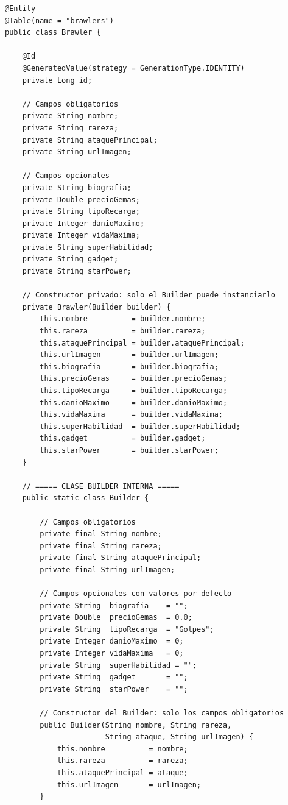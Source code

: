 \documentclass[12pt,a4paper]{article}
\begin{document}
\begin{lstlisting}[caption={Brawler.java -- La entidad con Builder interno}]
@Entity
@Table(name = "brawlers")
public class Brawler {

    @Id
    @GeneratedValue(strategy = GenerationType.IDENTITY)
    private Long id;

    // Campos obligatorios
    private String nombre;
    private String rareza;
    private String ataquePrincipal;
    private String urlImagen;

    // Campos opcionales
    private String biografia;
    private Double precioGemas;
    private String tipoRecarga;
    private Integer danioMaximo;
    private Integer vidaMaxima;
    private String superHabilidad;
    private String gadget;
    private String starPower;

    // Constructor privado: solo el Builder puede instanciarlo
    private Brawler(Builder builder) {
        this.nombre          = builder.nombre;
        this.rareza          = builder.rareza;
        this.ataquePrincipal = builder.ataquePrincipal;
        this.urlImagen       = builder.urlImagen;
        this.biografia       = builder.biografia;
        this.precioGemas     = builder.precioGemas;
        this.tipoRecarga     = builder.tipoRecarga;
        this.danioMaximo     = builder.danioMaximo;
        this.vidaMaxima      = builder.vidaMaxima;
        this.superHabilidad  = builder.superHabilidad;
        this.gadget          = builder.gadget;
        this.starPower       = builder.starPower;
    }

    // ===== CLASE BUILDER INTERNA =====
    public static class Builder {

        // Campos obligatorios
        private final String nombre;
        private final String rareza;
        private final String ataquePrincipal;
        private final String urlImagen;

        // Campos opcionales con valores por defecto
        private String  biografia    = "";
        private Double  precioGemas  = 0.0;
        private String  tipoRecarga  = "Golpes";
        private Integer danioMaximo  = 0;
        private Integer vidaMaxima   = 0;
        private String  superHabilidad = "";
        private String  gadget       = "";
        private String  starPower    = "";

        // Constructor del Builder: solo los campos obligatorios
        public Builder(String nombre, String rareza,
                       String ataque, String urlImagen) {
            this.nombre          = nombre;
            this.rareza          = rareza;
            this.ataquePrincipal = ataque;
            this.urlImagen       = urlImagen;
        }


\end{lstlisting}
\end{document}
